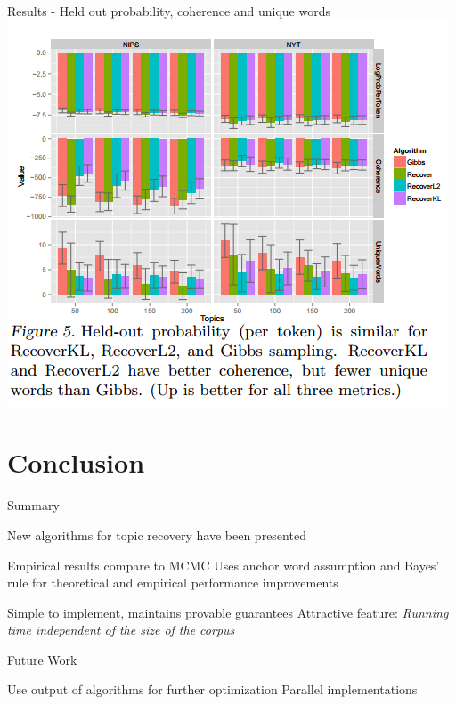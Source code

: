 \documentclass{lecture}
\begin{document}
\begin{plain}{Results - Held out probability, coherence and unique words}
\centering
\includegraphics[scale=0.6]{figs/results_fig5}
\end{plain}

\section[Conclusion]{Conclusion}
\begin{plain}{Summary}
\begin{itemize}
\p New algorithms for topic recovery have been presented
\begin{itemize}
\p Empirical results compare to MCMC
\p Uses anchor word assumption and Bayes' rule for theoretical and empirical performance improvements
\end{itemize}
\p Simple to implement, maintains provable guarantees
\p Attractive feature: \emph{Running time independent of the size of the corpus} 
\end{itemize}
\end{plain}

\begin{plain}{Future Work}
\begin{itemize}
\p Use output of algorithms for further optimization
\p Parallel implementations
\end{itemize}
\end{plain}
\end{document}
